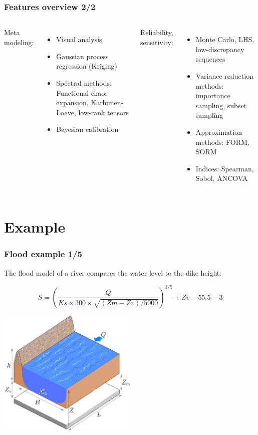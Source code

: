 \documentclass{beamer}
\begin{document}

\begin{frame}[containsverbatim]
\frametitle{Features overview 2/2}

  \begin{columns}
Meta modeling:
\begin{itemize}
\item Visual analysis
\item Gaussian process regression (Kriging)
\item Spectral methods: Functional chaos expansion, Karhunen-Loeve, low-rank tensors
\item Bayesian calibration
\end{itemize}


Reliability, sensitivity:
\begin{itemize}
\item Monte Carlo, LHS, low-discrepancy sequences
\item Variance reduction methods: importance sampling, subset sampling
\item Approximation methods: FORM, SORM
\item Indices: Spearman, Sobol, ANCOVA
\end{itemize}

\end{columns}

\end{frame}



\section{Example}

\begin{frame}[containsverbatim]
\frametitle{Flood example 1/5}

The flood model of a river compares the water level to the dike height:

$$S = \left(\frac{Q}{Ks\times300\times\sqrt{(Zm-Zv)/5000}}\right)^{3/5}+Zv-55.5-3$$


\begin{center}
\includegraphics[width=0.5\textwidth]{figures/crue}
\end{center}

\end{frame}
\end{document}
